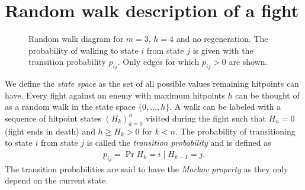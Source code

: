 \section{Random walk description of a fight}\label{chap:fightDef}
\begin{figure}\label{fig:randomWalk}
    \centering
    \caption{Random walk diagram for $m=3$, $h=4$ and no regeneration. The probability of walking to state $i$ from state $j$ is given with the transition probability $p_{ij}$. Only edges for which $p_{ij} > 0$ are shown.}
\end{figure}

We define the \textit{state space} as the set of all possible values remaining hitpoints can have. Every fight against an enemy with maximum hitpoints $h$ can be thought of as a random walk in the state space $\{0,\ldots,h\}$. A walk can be labeled with a sequence of hitpoint states $(H_k)_{k=0}^{n}$ visited during the fight such that $H_n=0$ (fight ends in death) and $h \geq H_k > 0$ for $k<n$.
The probability of transitioning to state $i$ from state $j$ is called the \textit{transition probability} and is defined as
\begin{align}\label{eq:transitionProbabilities}
    p_{ij} = \Pr{H_k = i \mid H_{k-1} = j}.
\end{align}
The transition probabilities are said to have the \textit{Markov property} as they only depend on the current state.

